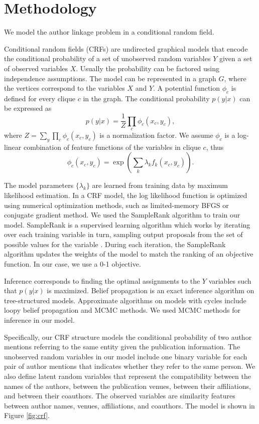 \documentclass[twocolumn,letterpaper]{article}
\begin{document}

\section{Methodology} %
\label{sec:methodology}
We model the author linkage problem in a conditional random field.

Conditional random fields (CRFs) are undirected graphical models that encode the conditional probability of a set of unobserved random variables $Y$ given a set of observed variables $X$.  Usually the probability can be factored using independence assumptions.  The model can be represented in a graph $G$, where the vertices correspond to the variables $X$ and $Y$.  A potential function $\phi_c$ is defined for every clique $c$ in the graph.  The conditional probability $p(y|x)$ can be expressed as
$$p(y|x)=\frac{1}{Z}\prod_c \phi_c(x_c,y_c),$$
where $Z=\sum_y\prod_c \phi_c(x_c,y_c)$ is a normalization factor.  We assume $\phi_c$ is a log-linear combination of feature functions of the variables in clique $c$, thus
$$\phi_c(x_c,y_c)=\exp\left(\sum_k \lambda_k f_k(x_c,y_c)\right).$$

The model parameters $\{\lambda_k\}$ are learned from training data by
maximum likelihood estimation.  In a CRF model, the log likelihood
function is optimized using numerical optimization methods, such as
limited-memory BFGS or conjugate gradient method. We used the SampleRank algorithm to train our model.
SampleRank is a supervised learning algorithm which works by iterating over each training variable in turn, sampling output proposals from the set of possible values for the variable  \cite{wick2009samplerank}. During each iteration, the SampleRank algorithm updates the weights of the model to match the ranking of an objective function. In our case, we use a 0-1 objective.

Inference corresponds to finding the optimal assignments to the $Y$
variables such that $p(y|x)$ is maximized.  Belief propagation is an exact inference algorithm on tree-structured models.  Approximate algorithms on models with cycles include loopy belief propagation and
MCMC methods. We used MCMC methods for inference in our model.



Specifically, our CRF structure models the conditional probability of
two author mentions referring to the same entity given the publication
information.  The unobserved random variables in our model include one
binary variable for each pair of author mentions that indicates
whether they refer to the same person.  We also define latent random
variables that represent the compatibility between the names of the
authors, between the publication venues, between their affiliations,
and between their coauthors.  The observed variables are similarity
features between author names, venues, affiliations, and coauthors.
The model is shown in Figure \ref{fig:crf}.
\end{document}
